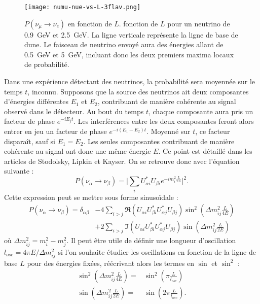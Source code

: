            \begin{figure}
            	\texttt{[image: numu-nue-vs-L-3flav.png]}
            	\caption[$P(\nu_{\mu}\to\nu_e)$ en fonction de $L$]{$P(\nu_{\mu}\to\nu_e)$ en fonction de $L$. fonction de $L$ pour un neutrino de \SI{0.9}{\giga\electronvolt} et \SI{2.5}{\giga\electronvolt}. La ligne verticale représente la ligne de base de \gls{dune}. Le faisceau de neutrino envoyé aura des énergies allant de \SI{0.5}{\giga\electronvolt} et \SI{5}{\giga\electronvolt}, incluant donc les deux premiers maxima locaux de probabilité.}
            	\label{fig::3flavors_oscillations}
            \end{figure}
            Dans une expérience détectant des neutrinos, la probabilité sera moyennée sur le temps $t$, inconnu. Supposons que la source des neutrinos ait deux composantes d'énergies différentes $E_1$ et $E_2$, contribuant de manière cohérente au signal observé dans le détecteur. Au bout du temps $t$, chaque composante aura pris un facteur de phase $e^{-iE_jt}$. Les interférences entre les deux composantes feront alors entrer en jeu un facteur de phase $e^{-i(E_1-E_2)t}$. Moyenné sur $t$, ce facteur disparaît, sauf si $E_1 = E_2$. Les seules composantes contribuant de manière cohérente au signal ont donc une même énergie $E$. Ce point est détaillé dans les articles de Stodolsky\cite{Stodolsky1998}, Lipkin\cite{Lipkin2005} et Kayser\cite{Kayser2005}. On se retrouve donc avec l'équation suivante : 
            \begin{equation*}
                P(\nu_{\alpha}\to\nu_{\beta}) = \bigg|\sum_i U_{\alpha i}^*U_{\beta i} e^{-im_i^2\frac{L}{2E}}\bigg|^2.
            \end{equation*}
            Cette expression peut se mettre sous forme sinusoïdale\cite{Mondal2015} :
            \begin{equation}\label{eq::proba_oscillation}
                \begin{split}
                    P(\nu_{\alpha}\to\nu_{\beta}) = \delta_{\alpha\beta} & - 4\sum_{i>j}\Re(U_{\alpha i}U_{\beta i}^*U_{\alpha j}^*U_{\beta j})\sin^2\left(\Delta m_{ij}^2\frac{L}{4E}\right) \\
                    & +2\sum_{i>j}\Im(U_{\alpha i}U_{\beta i}^*U_{\alpha j}^*U_{\beta j})\sin\left(\Delta m_{ij}^2\frac{L}{2E}\right)
                \end{split}
            \end{equation}
            où $\Delta m_{ij}^2 = m_i^2-m_j^2$. Il peut être utile de définir une longueur d'oscillation $l_{osc} = 4\pi E/\Delta m_{ij}^2$ si l'on souhaite étudier les oscillations en fonction de la ligne de base $L$ pour des énergies fixées, réécrivant alors les termes en $\sin$ et $\sin^2$ :
            \begin{eqnarray}
                \sin^2\left(\Delta m_{ij}^2\frac{L}{4E}\right) = &  \sin^2\left(\pi\frac{L}{l_{osc}}\right) \\
                \sin\left(\Delta m_{ij}^2\frac{L}{2E}\right) = & \sin\left(2\pi\frac{L}{l_{osc}}\right).
            \end{eqnarray}
                        
